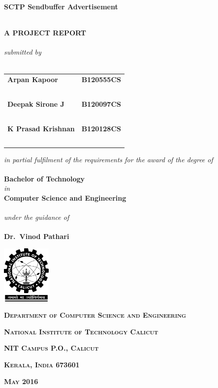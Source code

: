 \begin{titlepage}
  \centering

  {\large \textbf{SCTP Sendbuffer Advertisement}\\~\\}

  \textbf{A PROJECT REPORT}\\~\\

  \emph{submitted by}\\~\\

  \begin{tabular}{lr}
    \textbf{Arpan Kapoor} & \textbf{B120555CS}\\~\\
    \textbf{Deepak Sirone J} & \textbf{B120097CS}\\~\\
    \textbf{K Prasad Krishnan} & \textbf{B120128CS}\\~\\
  \end{tabular}

  \medskip
  \emph{in partial fulfilment of the requirements for the award of the degree of}\\~\\

  \textbf{Bachelor of Technology}\\
  \emph{in}\\
  \textbf{Computer Science and Engineering}\\~\\

  \emph{under the guidance of}\\~\\

  \textbf{Dr.~Vinod Pathari}

  \vspace*{1in}
  \includegraphics[width=0.18\textwidth]{imgs/nitc-logo.png}

  {\large \textbf{\textsc{Department of Computer Science and Engineering}}\par}
  {\large \textbf{\textsc{National Institute of Technology Calicut}}\par}
  {\large \textbf{\textsc{NIT Campus P.O., Calicut}}\par}
  {\large \textbf{\textsc{Kerala, India 673601}}\par}

  {\textbf{\textsc{May 2016}}}
\end{titlepage}

